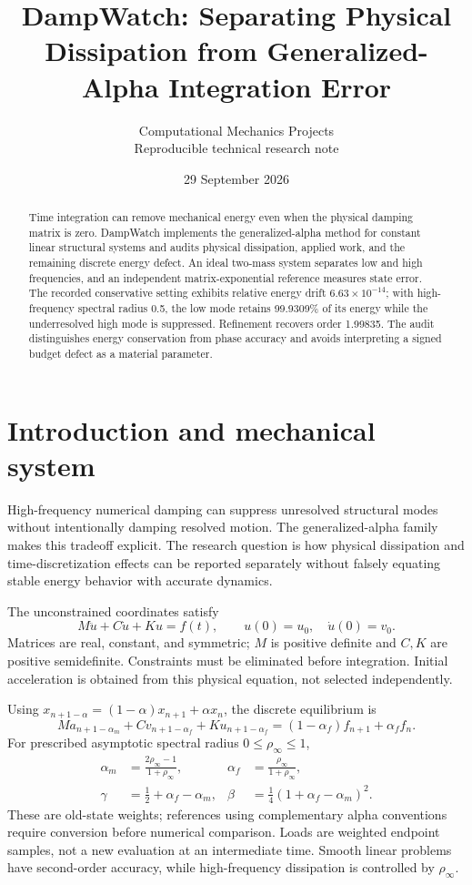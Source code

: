 \documentclass[10pt,a4paper]{article}
\title{\vspace{-1.3cm}\LARGE DampWatch: Separating Physical Dissipation from Generalized-Alpha Integration Error}
\author{\small Computational Mechanics Projects\\\small Reproducible technical research note}
\date{\small 29 September 2026}
\begin{document}
\maketitle\thispagestyle{fancy}

\begin{abstract}
Time integration can remove mechanical energy even when the physical damping matrix is zero. DampWatch implements the generalized-alpha method for constant linear structural systems and audits physical dissipation, applied work, and the remaining discrete energy defect. An ideal two-mass system separates low and high frequencies, and an independent matrix-exponential reference measures state error. The recorded conservative setting exhibits relative energy drift $6.63\times10^{-14}$; with high-frequency spectral radius 0.5, the low mode retains 99.9309\% of its energy while the underresolved high mode is suppressed. Refinement recovers order 1.99835. The audit distinguishes energy conservation from phase accuracy and avoids interpreting a signed budget defect as a material parameter.
\end{abstract}
\section{Introduction and mechanical system}
High-frequency numerical damping can suppress unresolved structural modes without intentionally damping resolved motion. The generalized-alpha family~\cite{chung} makes this tradeoff explicit. The research question is how physical dissipation and time-discretization effects can be reported separately without falsely equating stable energy behavior with accurate dynamics.

The unconstrained coordinates satisfy
\begin{equation}
M\ddot u+C\dot u+Ku=f(t),\qquad u(0)=u_0,\quad\dot u(0)=v_0.
\end{equation}
Matrices are real, constant, and symmetric; $M$ is positive definite and $C,K$ are positive semidefinite. Constraints must be eliminated before integration. Initial acceleration is obtained from this physical equation, not selected independently.

Using $x_{n+1-\alpha}=(1-\alpha)x_{n+1}+\alpha x_n$, the discrete equilibrium is
\begin{equation}
Ma_{n+1-\alpha_m}+Cv_{n+1-\alpha_f}+Ku_{n+1-\alpha_f}
=(1-\alpha_f)f_{n+1}+\alpha_f f_n.
\end{equation}
For prescribed asymptotic spectral radius $0\le\rho_\infty\le1$,
\begin{align}
\alpha_m&=\frac{2\rho_\infty-1}{1+\rho_\infty},&
\alpha_f&=\frac{\rho_\infty}{1+\rho_\infty},\\
\gamma&=\frac12+\alpha_f-\alpha_m,&
\beta&=\frac14(1+\alpha_f-\alpha_m)^2.
\end{align}
These are old-state weights; references using complementary alpha conventions require conversion before numerical comparison. Loads are weighted endpoint samples, not a new evaluation at an intermediate time. Smooth linear problems have second-order accuracy, while high-frequency dissipation is controlled by $\rho_\infty$.
\newpage
\end{document}

